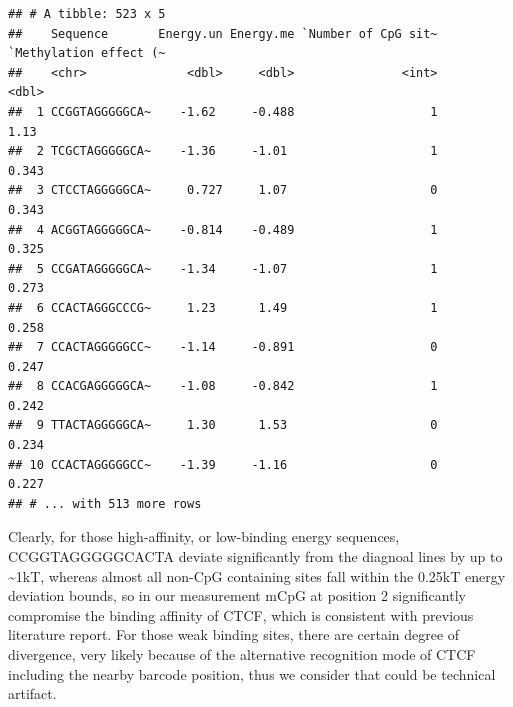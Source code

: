 \documentclass[
]{article}
\begin{document}
\begin{verbatim}
## # A tibble: 523 x 5
##    Sequence       Energy.un Energy.me `Number of CpG sit~ `Methylation effect (~
##    <chr>              <dbl>     <dbl>               <int>                  <dbl>
##  1 CCGGTAGGGGGCA~    -1.62     -0.488                   1                  1.13 
##  2 TCGCTAGGGGGCA~    -1.36     -1.01                    1                  0.343
##  3 CTCCTAGGGGGCA~     0.727     1.07                    0                  0.343
##  4 ACGGTAGGGGGCA~    -0.814    -0.489                   1                  0.325
##  5 CCGATAGGGGGCA~    -1.34     -1.07                    1                  0.273
##  6 CCACTAGGGCCCG~     1.23      1.49                    1                  0.258
##  7 CCACTAGGGGGCC~    -1.14     -0.891                   0                  0.247
##  8 CCACGAGGGGGCA~    -1.08     -0.842                   1                  0.242
##  9 TTACTAGGGGGCA~     1.30      1.53                    0                  0.234
## 10 CCACTAGGGGGCC~    -1.39     -1.16                    0                  0.227
## # ... with 513 more rows
\end{verbatim}

Clearly, for those high-affinity, or low-binding energy sequences,
C{CG}GTAGGGGGCACTA deviate significantly from the diagnoal lines by up
to \textasciitilde1kT, whereas almost all non-CpG containing sites fall
within the 0.25kT energy deviation bounds, so in our measurement mCpG at
position 2 significantly compromise the binding affinity of CTCF, which
is consistent with previous literature report. For those weak binding
sites, there are certain degree of divergence, very likely because of
the alternative recognition mode of CTCF including the nearby barcode
position, thus we consider that could be technical artifact.
\end{document}
